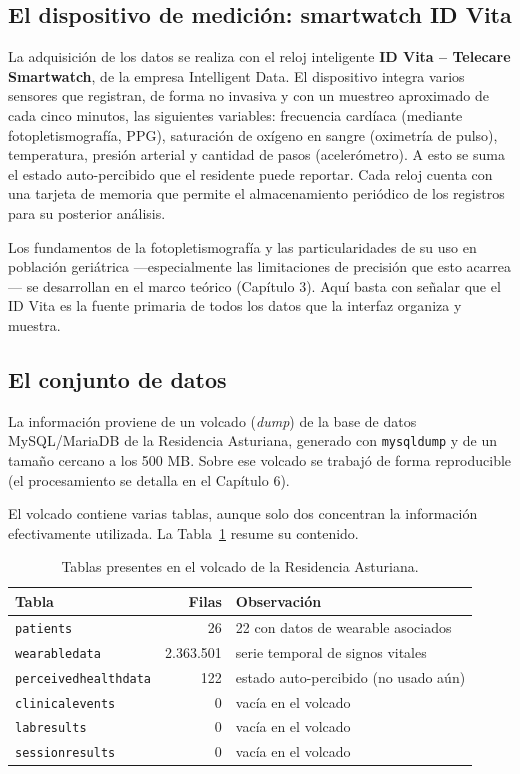\documentclass[12pt,a4paper]{article}
\begin{document}
    \subsection{El dispositivo de medición: smartwatch ID Vita}
    La adquisición de los datos se realiza con el reloj inteligente \textbf{ID Vita – Telecare Smartwatch}, de la empresa Intelligent Data. El dispositivo integra varios sensores que registran, de forma no invasiva y con un muestreo aproximado de cada cinco minutos, las siguientes variables: frecuencia cardíaca (mediante fotopletismografía, PPG), saturación de oxígeno en sangre (oximetría de pulso), temperatura, presión arterial y cantidad de pasos (acelerómetro). A esto se suma el estado auto-percibido que el residente puede reportar. Cada reloj cuenta con una tarjeta de memoria que permite el almacenamiento periódico de los registros para su posterior análisis.

    Los fundamentos de la fotopletismografía y las particularidades de su uso en población geriátrica —especialmente las limitaciones de precisión que esto acarrea— se desarrollan en el marco teórico (Capítulo 3). Aquí basta con señalar que el ID Vita es la fuente primaria de todos los datos que la interfaz organiza y muestra.

    \subsection{El conjunto de datos}
    La información proviene de un volcado (\textit{dump}) de la base de datos MySQL/MariaDB de la Residencia Asturiana, generado con \texttt{mysqldump} y de un tamaño cercano a los 500 MB. Sobre ese volcado se trabajó de forma reproducible (el procesamiento se detalla en el Capítulo 6).

    El volcado contiene varias tablas, aunque solo dos concentran la información efectivamente utilizada. La Tabla~\ref{tab:tablas} resume su contenido.

    \begin{table}[h]
        \centering
        \begin{tabular}{l r l}
            \hline
            \textbf{Tabla} & \textbf{Filas} & \textbf{Observación} \\
            \hline
            \texttt{patients} & 26 & 22 con datos de wearable asociados \\
            \texttt{wearabledata} & 2.363.501 & serie temporal de signos vitales \\
            \texttt{perceivedhealthdata} & 122 & estado auto-percibido (no usado aún) \\
            \texttt{clinicalevents} & 0 & vacía en el volcado \\
            \texttt{labresults} & 0 & vacía en el volcado \\
            \texttt{sessionresults} & 0 & vacía en el volcado \\
            \hline
        \end{tabular}
        \caption{Tablas presentes en el volcado de la Residencia Asturiana.}
        \label{tab:tablas}
    \end{table}
\end{document}
